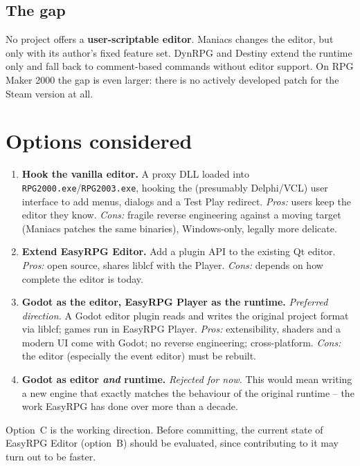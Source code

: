 \documentclass[11pt,a4paper]{article}
\begin{document}
\subsection{The gap}

No project offers a \textbf{user-scriptable editor}. Maniacs changes the editor, but
only with its author's fixed feature set. DynRPG and Destiny extend the runtime only and
fall back to comment-based commands without editor support. On RPG Maker 2000 the gap
is even larger: there is no actively developed patch for the Steam version at all.

\section{Options considered}

\begin{enumerate}[label=\textbf{\Alph*.}]
  \item \textbf{Hook the vanilla editor.} A proxy DLL loaded into
        \texttt{RPG2000.exe}/\texttt{RPG2003.exe}, hooking the (presumably Delphi/VCL)
        user interface to add menus, dialogs and a Test Play redirect.
        \emph{Pros:} users keep the editor they know.
        \emph{Cons:} fragile reverse engineering against a moving target (Maniacs patches
        the same binaries), Windows-only, legally more delicate.
  \item \textbf{Extend EasyRPG Editor.} Add a plugin API to the existing Qt editor.
        \emph{Pros:} open source, shares liblcf with the Player.
        \emph{Cons:} depends on how complete the editor is today.
  \item \textbf{Godot as the editor, EasyRPG Player as the runtime.} \emph{Preferred direction.}
        A Godot editor plugin reads and writes the original project format via liblcf;
        games run in EasyRPG Player.
        \emph{Pros:} extensibility, shaders and a modern UI come with Godot; no reverse
        engineering; cross-platform.
        \emph{Cons:} the editor (especially the event editor) must be rebuilt.
  \item \textbf{Godot as editor \emph{and} runtime.} \emph{Rejected for now.} This
        would mean writing a new engine that exactly matches the behaviour of the
        original runtime -- the work EasyRPG has done over more than a decade.
\end{enumerate}

\noindent Option~C is the working direction. Before committing, the current state of
EasyRPG Editor (option~B) should be evaluated, since contributing to it may turn out to
be faster.
\end{document}
